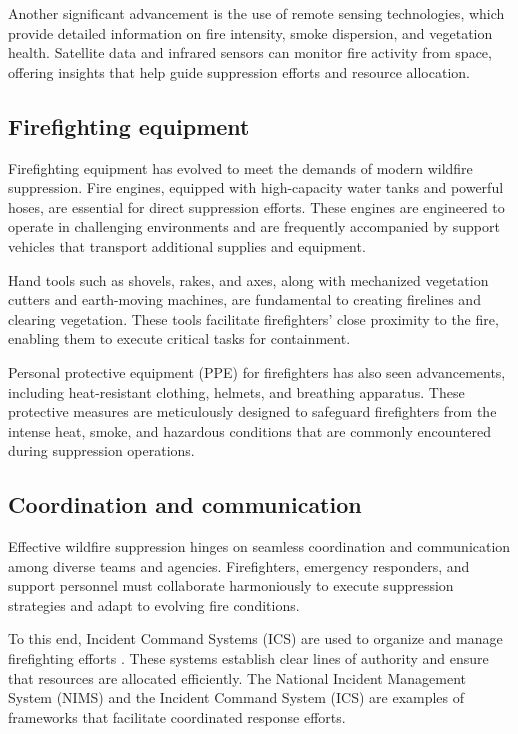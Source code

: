 \documentclass[
  12 pt,
]{Nemilov}
\begin{document}
Another significant advancement is the use of remote sensing technologies, which provide detailed information on fire intensity, smoke dispersion, and vegetation health. Satellite data and infrared sensors can monitor fire activity from space, offering insights that help guide suppression efforts and resource allocation.

\subsection{Firefighting equipment}\label{firefighting-equipment}

Firefighting equipment has evolved to meet the demands of modern wildfire suppression. Fire engines, equipped with high-capacity water tanks and powerful hoses, are essential for direct suppression efforts. These engines are engineered to operate in challenging environments and are frequently accompanied by support vehicles that transport additional supplies and equipment.

Hand tools such as shovels, rakes, and axes, along with mechanized vegetation cutters and earth-moving machines, are fundamental to creating firelines and clearing vegetation. These tools facilitate firefighters' close proximity to the fire, enabling them to execute critical tasks for containment.

Personal protective equipment (PPE) for firefighters has also seen advancements, including heat-resistant clothing, helmets, and breathing apparatus. These protective measures are meticulously designed to safeguard firefighters from the intense heat, smoke, and hazardous conditions that are commonly encountered during suppression operations.

\subsection{Coordination and communication}\label{coordination-and-communication}

Effective wildfire suppression hinges on seamless coordination and communication among diverse teams and agencies. Firefighters, emergency responders, and support personnel must collaborate harmoniously to execute suppression strategies and adapt to evolving fire conditions.

To this end, Incident Command Systems (ICS) are used to organize and manage firefighting efforts \citep{chang2017literature}. These systems establish clear lines of authority and ensure that resources are allocated efficiently. The National Incident Management System (NIMS) \citep{federal2017national} and the Incident Command System (ICS) \citep{mcallister2020incident} are examples of frameworks that facilitate coordinated response efforts.
\end{document}
